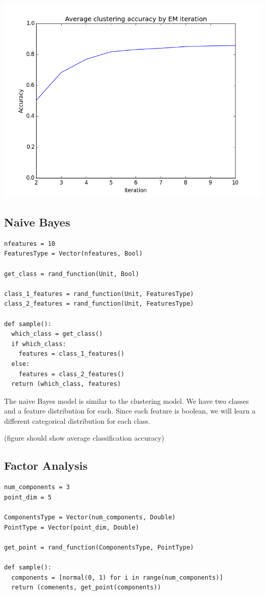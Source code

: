 \documentclass[proceed]{article}
\begin{document}
\begin{center}
\includegraphics[scale=0.5]{cluster_accuracy.png}
\end{center}

\subsection{Naive Bayes}

\begin{verbatim}
nfeatures = 10
FeaturesType = Vector(nfeatures, Bool)

get_class = rand_function(Unit, Bool)

class_1_features = rand_function(Unit, FeaturesType)
class_2_features = rand_function(Unit, FeaturesType)

def sample():
  which_class = get_class()
  if which_class:
    features = class_1_features()
  else:
    features = class_2_features()
  return (which_class, features)
\end{verbatim}

The naive Bayes model is similar to the clustering model.  We have two classes and a feature
distribution for each.  Since each feature is boolean, we will learn
a different categorical distribution for each class.

(figure should show average classification accuracy)

  \subsection{Factor Analysis}

\begin{verbatim}
num_components = 3
point_dim = 5

ComponentsType = Vector(num_components, Double)
PointType = Vector(point_dim, Double)

get_point = rand_function(ComponentsType, PointType)

def sample():
  components = [normal(0, 1) for i in range(num_components)]
  return (comenents, get_point(components))
\end{verbatim}
\end{document}
